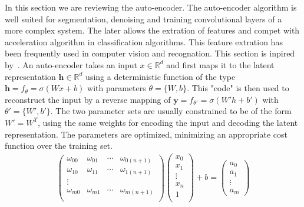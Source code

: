 \documentclass[final, paper=letter,5p,times,twocolumn]{elsarticle}
\begin{document}
In this section we are reviewing the auto-encoder. The auto-encoder algorithm is well suited for segmentation, denoising and training convolutional layers of a more complex system. The later allows the extration of features and compet with acceleration algorithm in classification algorithms. This feature extration has been frequently used in computer vision and recognation. This section is inpired by~\cite{Masci:2011:SCA:2029556.2029563}.
An auto-encoder takes an input $x \in \mathbb{R}^{d}$ and first maps it to the latent representation $\bm{h} \in \mathbb{R}^{d}$ using a deterministic function of the type $\bm{h} = f_{\theta} = \sigma(Wx + b)$ with parameters $\theta = \{W, b\}$. This "code" is then used to reconstruct the input by a reverse mapping of $\bm{y} = f_{\theta'} = \sigma( W'h + b')$ with $\theta' = \{W', b'\}$. The two parameter sets are usually constrained to be of the form $W' = W^{T}$, using the same weights for encoding the input and decoding the latent representation. The parameters are optimized, minimizing an appropriate cost function over the training set.\\

\begin{eqnarray*}
  \left(
  \begin{array}{cccc}
    \omega_{00} & \omega_{01} & \cdots & \omega_{0(n+1)} \\
    \omega_{10} & \omega_{11} & \cdots & \omega_{1(n+1)} \\
    \vdots \\
    \omega_{m0} & \omega_{m1} & \cdots & \omega_{m(n+1)} \\
  \end{array}
  \right) \left(
  \begin{array}{c}
    x_{0} \\
    x_{1} \\
    \vdots \\
    x_{n} \\
    1 \\
  \end{array}
  \right) + b = \left(
  \begin{array}{c}
    a_{0} \\
    a_{1} \\
    \vdots \\
    a_{m} 
  \end{array}
  \right)
\end{eqnarray*}
\end{document}

